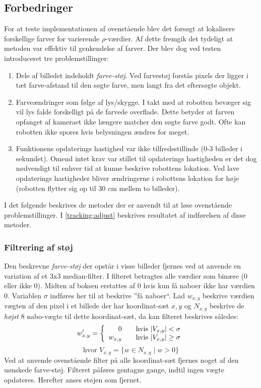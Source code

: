 \subsection{Forbedringer}
For at teste implementationen af ovenstående blev det forsøgt at lokalisere forskellige farver for varierende $\rho$-værdier.
Af dette fremgik det tydeligt at metoden var effektiv til genkendelse af farver.
Der blev dog ved testen introduceret tre problemstillinger:
\begin{enumerate}
\item Dele af billedet indeholdt \emph{farve-støj}.
Ved farvestøj forstås pixels der ligger i tæt farve-afstand til den søgte farve, men langt fra det eftersøgte objekt.
\item Farveændringer som følge af lys/skygge.
I takt med at robotten bevæger sig vil lys falde forskelligt på de farvede overflade.
Dette betyder at farven opfanget af kameraet ikke længere matcher den søgte farve godt.
Ofte kan robotten ikke spores hvis belysningen ændres for meget.
\item Funktionens opdaterings hastighed var ikke tilfredsstillinde (0-3 billeder i sekundet).
Omend intet krav var stillet til opdaterings hastigheden er det dog nødvendigt til enhver tid at kunne beskrive robottens lokation.
Ved lave opdaterings hastigheder bliver ændringerne i robottens lokation for høje (robotten flytter sig op til 30 cm mellem to billeder).
\end{enumerate}

I det følgende beskrives de metoder der er anvendt til at løse ovenstående problemstillinger.
I \cref{tracking:adjust} beskrives resultatet af indførelsen af disse metoder.

\subsubsection{Filtrering af støj}
Den beskrevne \emph{farve-støj} der opstår i visse billeder fjernes ved at anvende en variation af et 3x3 median-filter\cite{medianfilter}.
I filteret betragtes alle værdier som binære (0 eller ikke 0).
Midten af boksen erstattes af 0 hvis kun få naboer ikke har værdien 0.
Variablen $\sigma$ indføres her til at beskrive ''få naboer``.
Lad $w_{x,y}$ beskrive værdien vægten af den pixel i et billede der har koordinat-sæt $x,y$ og $N_{x,y}$ beskrive de \emph{højst} 8 nabo-vægte til dette koordinat-sæt, da kan filteret beskrives således:
\begin{equation}
w_{x,y}' = \left\{ 
  \begin{array}{r l}
        0 & \quad \text{hvis $|V_{x,y}| < \sigma$} \\
        w_{x,y} & \quad \text{hvis $|V_{x,y}| \geq \sigma$}
  \end{array} \right.
\end{equation}
$$\text{hvor } V_{x,y} = \{ w \in N_{x,y} \mid w > 0 \}$$
Ved at anvende ovenstående filter på alle koordinat-sæt fjernes noget af den uønskede farve-støj.
Filteret påføres gentagne gange, indtil ingen vægte opdateres.
Herefter anses støjen som fjernet.

